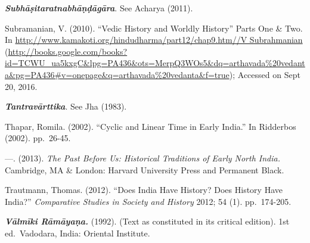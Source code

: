 \begin{thebibliography}{99}
  \textbf{\textit{Subhāṣitaratnabhāṇḍāgāra}}. See Acharya (2011).

  Subramanian, V. (2010). “Vedic History and Worldly History” Parts One \& Two. In \url{http://www.kamakoti.org/hindudharma/part12/chap9.htm//V Subrahmanian} (\url{http://books.google.com/books?id=TCWU_ua5kxgC&lpg=PA436&ots=MerpQ3WOs5&dq=arthavada%20vedanta&pg=PA436#v=onepage&q=arthavada%20vedanta&f=true}); Accessed on Sept 20, 2016.

  \textbf{\textit{Tantravārttika}}. See Jha (1983).

  Thapar, Romila. (2002). “Cyclic and Linear Time in Early India.” In Ridderbos (2002). pp.~26-45.

  —. (2013). \textit{The Past Before Us: Historical Traditions of Early North India.} Cambridge, MA \& London: Harvard University Press and Permanent Black.

  Trautmann, Thomas. (2012). “Does India Have History? Does History Have India?” \textit{Comparative Studies in Society and History} 2012; 54 (1). pp.~174-205.

  \textbf{\textit{Vālmīki Rāmāyaṇa.}} (1992). (Text as constituted in its critical edition). 1st ed.\ Vadodara, India: Oriental Institute.

 \end{thebibliography}

\theendnotes

